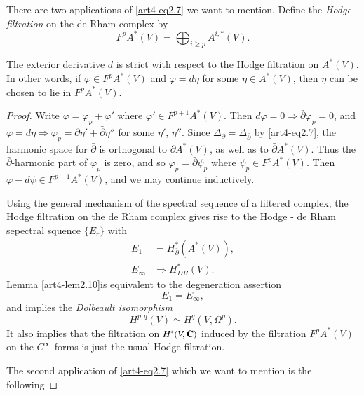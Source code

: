 There are two applications of \eqref{art4-eq2.7} we want to mention. Define the \textit{Hodge filtration} on the de Rham complex by 
$$
F^pA^{\ast} (V) = \bigoplus_{i \geqslant p} A^{i,\ast} (V).
$$

\setcounter{lemma}{9}
\begin{lemma}\label{art4-lem2.10}
The exterior derivative $d$ is strict with respect to the Hodge filtration on $A^\ast(V)$. In other words, if $\varphi \in F^p A^\ast (V)$ and $\varphi = d\eta$ for some $\eta \in A^\ast (V)$, then $\eta$ can be chosen to lie in $F^p A^\ast(V)$.
\end{lemma}

\begin{proof}
Write $\varphi = \varphi_p + \varphi'$ where $\varphi' \in F^{p+1} A^\ast (V)$. Then $d\varphi = 0 \Rightarrow \bar{\partial}\varphi_p = 0$, and $\varphi = d\eta \Rightarrow \varphi_p = \partial \eta' + \bar{\partial}\eta''$ for some $\eta'$, $\eta''$. Since $\Delta_\partial=\Delta_{\bar{\partial}}$ by \eqref{art4-eq2.7}, the harmonic space for $\bar{\partial}$ is orthogonal to $\partial A^\ast (V)$, as well as to $\bar{\partial} A^\ast (V)$. Thus the $\bar{\partial}$-harmonic part of $\varphi_p$ is zero, and so $\varphi_p = \bar{\partial} \psi_p$ where $\psi_p \in F^p A^\ast (V)$. Then $\varphi - d \psi \in F^{p+1} A^\ast (V)$, and we may continue inductively.

Using the general mechanism of the spectral sequence of a filtered complex, the Hodge filtration on the de Rham complex gives rise to the Hodge - de Rham sepectral squence $\{E_r\}$ with
\begin{align*}
E_1 & = H^{\ast}_{\bar{\partial}} (A^\ast (V)), \\
E_\infty & \Rightarrow H^\ast_{DR} (V).
\end{align*}
Lemma \ref{art4-lem2.10}\pageoriginale  is equivalent to the degeneration assertion
\setcounter{equation}{10}
\begin{equation}
E_1 = E_\infty, \label{art4-eq2.11}
\end{equation}
and implies the \textit{Dolbeault isomorphism}
\begin{equation}
H^{p,q} (V) \simeq H^q (V, \Omega^p) .\label{art4-eq2.12}
\end{equation}
It also implies that the filtration on $H^\ast(V, \mathbf{C})$ induced by the filtration $F^p A^\ast (V)$ on the $C^\infty$ forms is just the usual Hodge filtration.

The second application of \eqref{art4-eq2.7} which we want to mention is the following
\end{proof}

